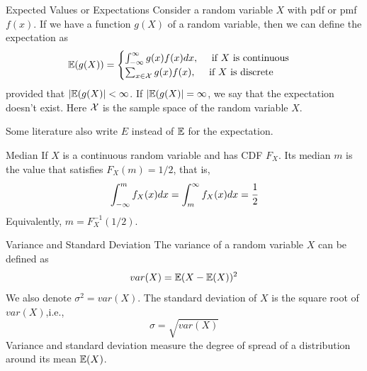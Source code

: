 \documentclass[aspectratio=169,xcolor=dvipsnames,svgnames,x11names,fleqn]{beamer}
\begin{document}
    \begin{frame}{Expected Values or Expectations}
        Consider a random variable $X$ with pdf or pmf $f(x)$.
        If we have a function $g(X)$ of a random variable, then we can define the expectation as 
        \begin{equation}
            {\mathbb E}( g(X)) = \begin{cases}
                \int_{-\infty}^\infty g(x) f(x) dx, \quad \text{~if~} X \text{~is continuous}\\
                \sum_{x\in {\mathcal X}} g(x) f(x), \quad \text{~if~} X \text{~is discrete}
            \end{cases}
        \end{equation}
    provided that $|{\mathbb E}(g(X)| < \infty$. If $|{\mathbb E}(g(X)| = \infty$, we say that the expectation doesn't exist. Here ${\mathcal X}$ is the sample space of the random variable $X$.
    
    Some literature also write $E$ instead of ${\mathbb E}$ for the expectation.
    
    {\color{red}{Expectation is also referred to as mean or average.}}
    \end{frame}
    
    \begin{frame}{Median}
        If $X$ is a continuous random variable and has CDF $F_X$. Its median $m$ is the value that satisfies $F_X(m) = 1/2$, that is,
        \begin{equation}
            \int_{-\infty}^m f_X(x) dx = \int_m^\infty f_X(x)dx = \cfrac{1}{2}
        \end{equation}
        Equivalently, $m = F^{-1}_X (1/2)$.
    \end{frame}
    
    \begin{frame}{Variance and Standard Deviation}
    The variance of a random variable $X$ can be defined as 
    \begin{equation}
        var(X) = {\mathbb E}(X - {\mathbb E}(X))^2
    \end{equation}
    We also denote $\sigma^2 = var(X)$. The standard deviation of $X$ is the square root of $var(X)$,i.e.,
    \begin{equation}
        \sigma = \sqrt{var(X)}
    \end{equation}
    Variance and standard deviation measure the degree of spread of a distribution around its mean ${\mathbb E}(X)$.
    \end{frame}
\end{document}

